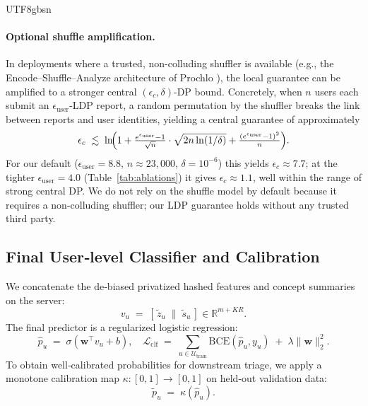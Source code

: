 \documentclass[lettersize,journal]{IEEEtran}
\begin{document}
\begin{CJK*}{UTF8}{gbsn}
\paragraph{Optional shuffle amplification.}
In deployments where a trusted, non-colluding shuffler is available (e.g., the Encode--Shuffle--Analyze architecture of Prochlo \cite{bittau2017prochlo}), the local guarantee can be amplified to a stronger central $(\epsilon_c, \delta)$-DP bound. Concretely, when $n$ users each submit an $\epsilon_{\text{user}}$-LDP report, a random permutation by the shuffler breaks the link between reports and user identities, yielding a central guarantee of approximately \cite{balle2019shuffle,erlingsson2019shuffle}
\begin{equation}
  \epsilon_c \;\lesssim\;
  \ln\!\Bigl(1 + \tfrac{e^{\epsilon_{\text{user}}}-1}{\sqrt{n}}
  \cdot \sqrt{2n\ln(1/\delta)} + \tfrac{(e^{\epsilon_{\text{user}}}-1)^2}{n}\Bigr).
\end{equation}
For our default ($\epsilon_{\text{user}}{=}8.8$, $n{\approx}23{,}000$, $\delta{=}10^{-6}$) this yields $\epsilon_c \approx 7.7$; at the tighter $\epsilon_{\text{user}}{=}4.0$ (Table~\ref{tab:ablations}) it gives $\epsilon_c \approx 1.1$, well within the range of strong central DP. We do not rely on the shuffle model by default because it requires a non-colluding shuffler; our LDP guarantee holds without any trusted third party.

\subsection{Final User‑level Classifier and Calibration}
We concatenate the de‑biased privatized hashed features and concept summaries on the server:
\begin{equation}
    v_u \;=\; \left[\, \tilde{z}_u \;\|\; \tilde{s}_u \,\right] \in \mathbb{R}^{m + K R}.
\end{equation}
The final predictor is a regularized logistic regression:
\begin{equation}
    \hat{p}_u \;=\; \sigma(\mathbf{w}^\top v_u + b), \quad
    \mathcal{L}_{\text{clf}} 
    \;=\; \sum_{u \in \mathcal{U}_{\text{train}}}
    \mathrm{BCE}(\hat{p}_u, y_u) \;+\; \lambda \lVert \mathbf{w} \rVert_2^2.
\end{equation}
To obtain well‑calibrated probabilities for downstream triage, we apply a monotone calibration map $\kappa:[0,1]\to[0,1]$ on held‑out validation data:
\begin{equation}
    \tilde{p}_u \;=\; \kappa(\hat{p}_u).
\end{equation}

\end{CJK*}
\end{document}
